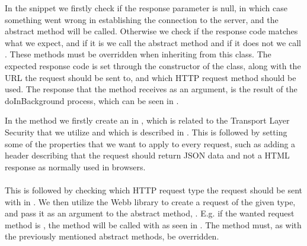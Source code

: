 
\FloatBarrier

In the snippet we firstly check if the response parameter is null, in which case something went wrong in establishing the connection to the server, and the abstract method  will be called. Otherwise we check if the response code matches what we expect, and if it is we call the abstract method  and if it does not we call . These methods must be overridden when inheriting from this class. The expected response code is set through the constructor of the class, along with the URL the request should be sent to, and which HTTP request method should be used. The response that the  method receives as an argument, is the result of the doInBackground process, which can be seen in . 


\FloatBarrier

In the  method we firstly create an  in , which is related to the Transport Layer Security that we utilize and which is described in . This is followed by setting some of the properties that we want to apply to every request, such as adding a header describing that the request should return JSON data and not a HTML response as normally used in browsers. 
\\\\
This is followed by checking which HTTP request type the request should be sent with in . We then utilize the Webb library to create a request of the given type, and pass it as an argument to the abstract method, . E.g. if the wanted request method is , the  method will be called with  as seen in . The  method must, as with the previously mentioned abstract methods, be overridden.